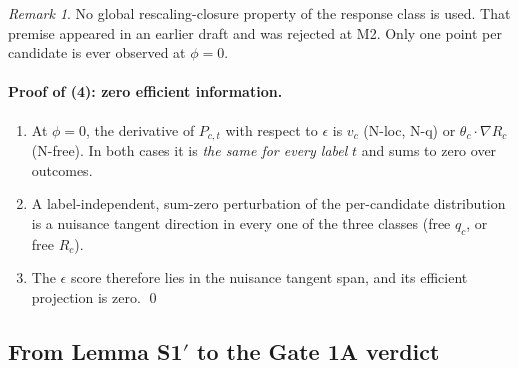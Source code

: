 \documentclass[11pt,a4paper]{article}
\theoremstyle{plain}
\theoremstyle{definition}
\theoremstyle{remark}
\newtheorem*{remark}{Remark}
\newcommand{\eps}{\epsilon}
\begin{document}
\begin{remark}
No global rescaling-closure property of the response class is used. That premise appeared in an
earlier draft and was rejected at M2. Only one point per candidate is ever observed at $\phi=0$.
\end{remark}

\paragraph{Proof of (4): zero efficient information.}
\begin{enumerate}[label=\textbf{Step \arabic*.},leftmargin=*,itemsep=2pt]
\item At $\phi=0$, the derivative of $P_{c,t}$ with respect to $\eps$ is $v_c$ (N-loc, N-q) or
$\theta_c\cdot\nabla R_c$ (N-free). In both cases it is \emph{the same for every label} $t$ and sums
to zero over outcomes.
\item A label-independent, sum-zero perturbation of the per-candidate distribution is a nuisance
tangent direction in every one of the three classes (free $q_c$, or free $R_c$).
\item The $\eps$ score therefore lies in the nuisance tangent span, and its efficient projection is zero. \qed
\end{enumerate}

\subsection{\texorpdfstring{From Lemma S1$'$ to the Gate 1A verdict}{From Lemma S1' to the Gate 1A verdict}}
\end{document}
